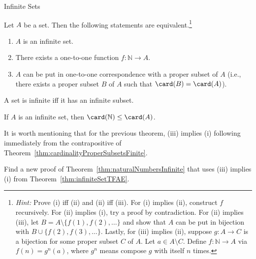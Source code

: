 \begin{section}{Infinite Sets}
\begin{theorem}\label{thm:infiniteSetTFAE}
Let $A$ be a set. Then the following statements are equivalent.\footnote{\emph{Hint:} Prove (i) iff (ii) and (ii) iff (iii). For (i) implies (ii), construct $f$ recursively. For (ii) implies (i), try a proof by contradiction. For (ii) implies (iii), let $B=A\setminus \{f(1),f(2),\ldots\}$ and show that $A$ can be put in bijection with $B\cup\{f(2),f(3),\ldots\}$. Lastly, for (iii) implies (ii), suppose $g:A\to C$ is a bijection for some proper subset $C$ of $A$. Let $a\in A\setminus C$. Define $f:\mathbb{N}\to A$ via $f(n)=g^n(a)$, where $g^n$ means compose $g$ with itself $n$ times.}
\begin{enumerate}[label=\textrm{(\roman*)}]
\item $A$ is an infinite set.
\item There exists a one-to-one function $f:\mathbb{N}\to A$.
\item $A$ can be put in one-to-one correspondence with a proper subset of $A$ (i.e., there exists a proper subset $B$ of $A$ such that $\card(B)=\card(A)$).
\end{enumerate}
\end{theorem}

\begin{corollary}\label{cor:infiniteSetInfiniteSubset}
A set is infinite iff it has an infinite subset.
\end{corollary}

\begin{corollary}
If $A$ is an infinite set, then $\card(\mathbb{N})\leq \card(A)$.
\end{corollary}

It is worth mentioning that for the previous theorem, (iii) implies (i) following immediately from the contrapositive of Theorem~\ref{thm:cardinalityProperSubsetsFinite}.

\begin{problem}
Find a new proof of Theorem~\ref{thm:naturalNumbersInfinite} that uses (iii) implies (i) from Theorem~\ref{thm:infiniteSetTFAE}.
\end{problem}


\end{section}
